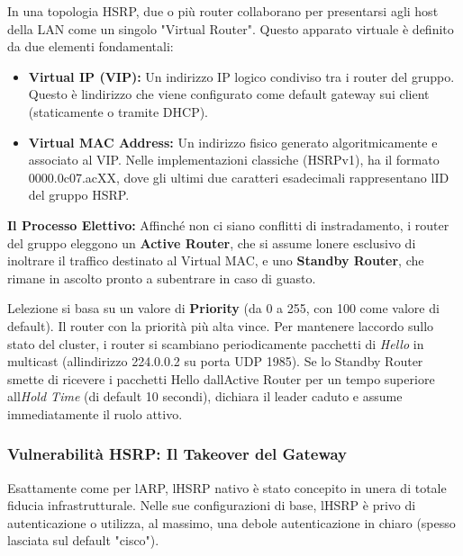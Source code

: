 \documentclass[11pt,a4paper]{article}
\begin{document}
In una topologia HSRP, due o più router collaborano per presentarsi agli
host della LAN come un singolo "Virtual Router". Questo apparato
virtuale è definito da due elementi fondamentali:

\begin{itemize}
\item
  \textbf{Virtual IP (VIP):} Un indirizzo IP logico condiviso tra i
  router del gruppo. Questo è l\textquotesingle indirizzo che viene
  configurato come default gateway sui client (staticamente o tramite
  DHCP).
\item
  \textbf{Virtual MAC Address:} Un indirizzo fisico generato
  algoritmicamente e associato al VIP. Nelle implementazioni classiche
  (HSRPv1), ha il formato 0000.0c07.acXX, dove gli ultimi due caratteri
  esadecimali rappresentano l\textquotesingle ID del gruppo HSRP.
\end{itemize}

\textbf{Il Processo Elettivo:} Affinché non ci siano conflitti di
instradamento, i router del gruppo eleggono un \textbf{Active Router},
che si assume l\textquotesingle onere esclusivo di inoltrare il traffico
destinato al Virtual MAC, e uno \textbf{Standby Router}, che rimane in
ascolto pronto a subentrare in caso di guasto.

L\textquotesingle elezione si basa su un valore di \textbf{Priority} (da
0 a 255, con 100 come valore di default). Il router con la priorità più
alta vince. Per mantenere l\textquotesingle accordo sullo stato del
cluster, i router si scambiano periodicamente pacchetti di \emph{Hello}
in multicast (all\textquotesingle indirizzo 224.0.0.2 su porta UDP
1985). Se lo Standby Router smette di ricevere i pacchetti Hello
dall\textquotesingle Active Router per un tempo superiore
all\textquotesingle{}\emph{Hold Time} (di default 10 secondi), dichiara
il leader caduto e assume immediatamente il ruolo attivo.

\subsubsection{Vulnerabilità HSRP: Il Takeover del
Gateway}\label{vulnerabilituxe0-hsrp-il-takeover-del-gateway}

Esattamente come per l\textquotesingle ARP, l\textquotesingle HSRP
nativo è stato concepito in un\textquotesingle era di totale fiducia
infrastrutturale. Nelle sue configurazioni di base,
l\textquotesingle HSRP è privo di autenticazione o utilizza, al massimo,
una debole autenticazione in chiaro (spesso lasciata sul default
"cisco").
\end{document}
